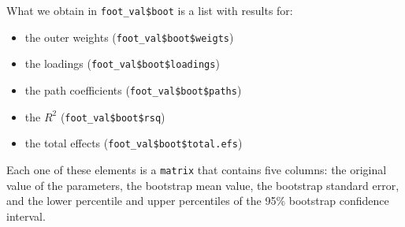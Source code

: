 \documentclass[12pt]{book}\usepackage{graphicx, color}
\newcommand{\code}[1]{\texttt{#1}}
\begin{document}
What we obtain in \code{foot\_val\$boot} is a list with results for:
\begin{itemize}
 \item the outer weights (\code{foot\_val\$boot\$weigts})
 \item the loadings (\code{foot\_val\$boot\$loadings})
 \item the path coefficients (\code{foot\_val\$boot\$paths})
 \item the $R^2$ (\code{foot\_val\$boot\$rsq}) 
 \item the total effects (\code{foot\_val\$boot\$total.efs})
\end{itemize}
Each one of these elements is a \code{matrix} that contains five columns: the original value of the parameters, the bootstrap mean value, the bootstrap standard error, and the lower percentile and upper percentiles of the 95\% bootstrap confidence interval.
\end{document}

